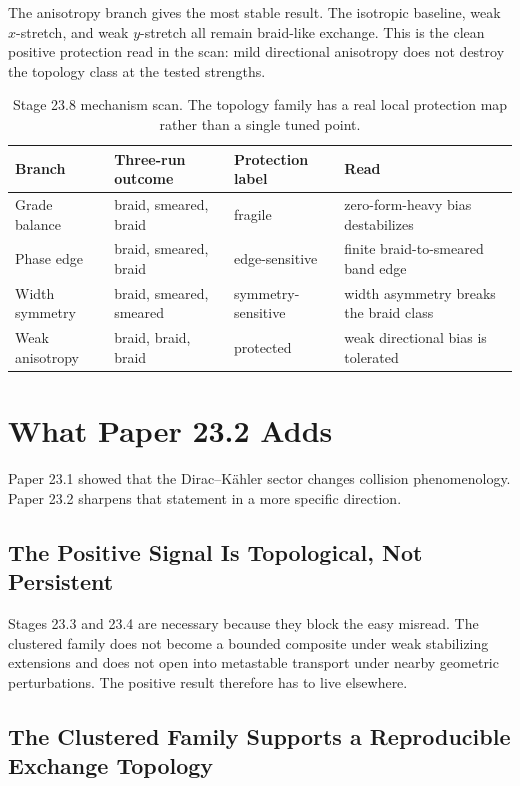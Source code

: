 \documentclass[11pt]{article}
\begin{document}
The anisotropy branch gives the most stable result. The isotropic baseline, weak $x$-stretch, and weak $y$-stretch all remain braid-like exchange. This is the clean positive protection read in the scan: mild directional anisotropy does not destroy the topology class at the tested strengths.

\begin{table}[h]
\centering
\scriptsize
\begin{tabular}{@{}p{1.2in}p{1.8in}p{1.2in}p{1.3in}@{}}
\toprule
Branch & Three-run outcome & Protection label & Read \\
\midrule
Grade balance & braid, smeared, braid & fragile & zero-form-heavy bias destabilizes \\
Phase edge & braid, smeared, braid & edge-sensitive & finite braid-to-smeared band edge \\
Width symmetry & braid, smeared, smeared & symmetry-sensitive & width asymmetry breaks the braid class \\
Weak anisotropy & braid, braid, braid & protected & weak directional bias is tolerated \\
\bottomrule
\end{tabular}
\caption{Stage 23.8 mechanism scan. The topology family has a real local protection map rather than a single tuned point.}
\end{table}

\section{What Paper 23.2 Adds}

Paper 23.1 showed that the Dirac--K\"ahler sector changes collision phenomenology. Paper 23.2 sharpens that statement in a more specific direction.

\subsection{The Positive Signal Is Topological, Not Persistent}

Stages 23.3 and 23.4 are necessary because they block the easy misread. The clustered family does not become a bounded composite under weak stabilizing extensions and does not open into metastable transport under nearby geometric perturbations. The positive result therefore has to live elsewhere.

\subsection{The Clustered Family Supports a Reproducible Exchange Topology}
\end{document}
